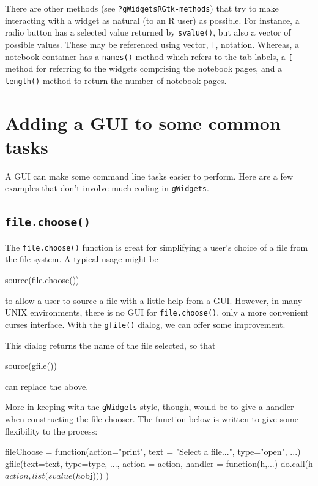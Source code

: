 \documentclass[12pt]{article}
\newcommand{\RCode}[1]{\texttt{#1}}
\newcommand{\RFunc}[1]{\texttt{#1()}}
\begin{document}
There are other methods (see \RCode{?gWidgetsRGtk-methods}) that try
to make interacting with a widget as natural (to an R user) as possible. For
instance, a radio button has a selected value returned by
\RFunc{svalue}, but also a vector of possible values. These may be
referenced using vector, \RCode{[}, notation. Whereas, a notebook
container has a \RFunc{names} method which refers to the tab labels,
a \RCode{[} method for referring to the widgets comprising the notebook
pages, and a \RFunc{length} method to return the number of notebook pages.

\section{Adding a GUI to some common  tasks}

A GUI can make some command line tasks easier to perform. Here are a
few examples that don't involve much coding in \RCode{gWidgets}.

\subsection{\RFunc{file.choose}}
The \RFunc{file.choose} function is great for simplifying a user's
choice of a file from the file system. A typical usage might be
\begin{Soutput}
  source(file.choose())
\end{Soutput}
to allow a user to source a file with a little help from a
GUI. However, in many UNIX environments, there is no GUI for
\RFunc{file.choose}, only a more convenient curses interface.  With
the \RFunc{gfile} dialog, we can offer some improvement. 

This dialog returns the name of the file selected, so that
\begin{Soutput}
  source(gfile())
\end{Soutput}
can replace the above.


More in keeping with the \RCode{gWidgets} style, though, would be to
give a handler when constructing the file chooser.  The function
below is written to give some flexibility to the process:

\begin{Scode}
  fileChoose = function(action="print", text = "Select a file...",
  type="open", ...) {
    gfile(text=text, type=type, ..., action = action, handler =
    function(h,...) {
      do.call(h$action, list(svalue(h$obj)))
    })
    }
\end{Scode}
\end{document}
